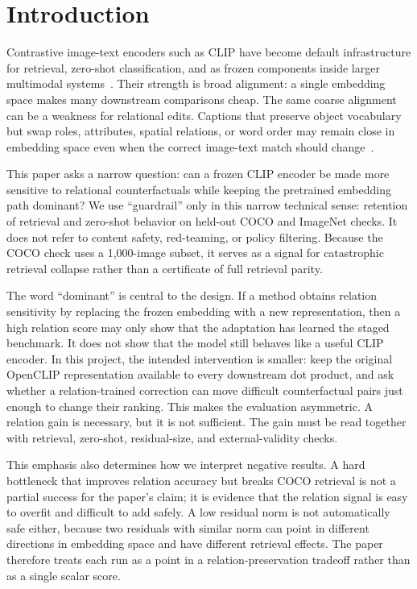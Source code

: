 \section{Introduction}

Contrastive image-text encoders such as CLIP have become default infrastructure for retrieval, zero-shot classification, and as frozen components inside larger multimodal systems~\cite{radford2021clip,ilharco2021openclip}. Their strength is broad alignment: a single embedding space makes many downstream comparisons cheap. The same coarse alignment can be a weakness for relational edits. Captions that preserve object vocabulary but swap roles, attributes, spatial relations, or word order may remain close in embedding space even when the correct image-text match should change~\cite{yuksekgonul2022bags,hsieh2023sugarcrepe,thrush2022winoground}.

This paper asks a narrow question: can a frozen CLIP encoder be made more sensitive to relational counterfactuals while keeping the pretrained embedding path dominant? We use ``guardrail'' only in this narrow technical sense: retention of retrieval and zero-shot behavior on held-out COCO and ImageNet checks. It does not refer to content safety, red-teaming, or policy filtering. Because the COCO check uses a 1,000-image subset, it serves as a signal for catastrophic retrieval collapse rather than a certificate of full retrieval parity.

The word ``dominant'' is central to the design. If a method obtains relation sensitivity by replacing the frozen embedding with a new representation, then a high relation score may only show that the adaptation has learned the staged benchmark. It does not show that the model still behaves like a useful CLIP encoder. In this project, the intended intervention is smaller: keep the original OpenCLIP representation available to every downstream dot product, and ask whether a relation-trained correction can move difficult counterfactual pairs just enough to change their ranking. This makes the evaluation asymmetric. A relation gain is necessary, but it is not sufficient. The gain must be read together with retrieval, zero-shot, residual-size, and external-validity checks.

This emphasis also determines how we interpret negative results. A hard bottleneck that improves relation accuracy but breaks COCO retrieval is not a partial success for the paper's claim; it is evidence that the relation signal is easy to overfit and difficult to add safely. A low residual norm is not automatically safe either, because two residuals with similar norm can point in different directions in embedding space and have different retrieval effects. The paper therefore treats each run as a point in a relation-preservation tradeoff rather than as a single scalar score.

